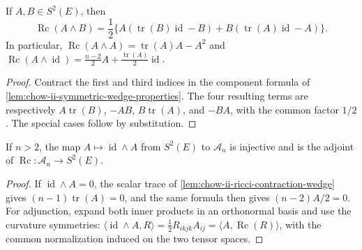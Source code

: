 \begin{lemma}
  \label{lem:chow-ii-ricci-contraction-wedge}
  If \(A,B\in S^2(E)\), then
  \[
  \operatorname{Rc}(A\wedge B)
   =\frac12\{A(\operatorname{tr}(B)\operatorname{id}-B)
             +B(\operatorname{tr}(A)\operatorname{id}-A)\}.
  \]
  In particular,
  \(\operatorname{Rc}(A\wedge A)=\operatorname{tr}(A)A-A^2\) and
  \(\operatorname{Rc}(A\wedge\operatorname{id})
    =\tfrac{n-2}{2}A+\tfrac{\operatorname{tr}(A)}2\operatorname{id}\).
\end{lemma}
\begin{proof}
  Contract the first and third indices in the component formula of
  \ref{lem:chow-ii-symmetric-wedge-properties}.  The four resulting terms
  are respectively \(A\operatorname{tr}(B)\), \(-AB\),
  \(B\operatorname{tr}(A)\), and \(-BA\), with the common factor \(1/2\).
  The special cases follow by substitution.
\end{proof}

\begin{lemma}
  \label{lem:chow-ii-wedge-embedding-ricci-adjoint}
  If \(n>2\), the map \(A\mapsto\operatorname{id}\wedge A\) from
  \(S^2(E)\) to \(\mathcal A_n\) is injective and is the adjoint of
  \(\operatorname{Rc}:\mathcal A_n\to S^2(E)\).
\end{lemma}
\begin{proof}
  If \(\operatorname{id}\wedge A=0\), the scalar trace of
  \ref{lem:chow-ii-ricci-contraction-wedge} gives
  \((n-1)\operatorname{tr}(A)=0\), and the same formula then gives
  \((n-2)A/2=0\).  For adjunction, expand both inner products in an
  orthonormal basis and use the curvature symmetries:
  \(\langle\operatorname{id}\wedge A,R\rangle
  =\tfrac12R_{ikjk}A_{ij}=\langle A,\operatorname{Rc}(R)\rangle\), with the
  common normalization induced on the two tensor spaces.
\end{proof}

